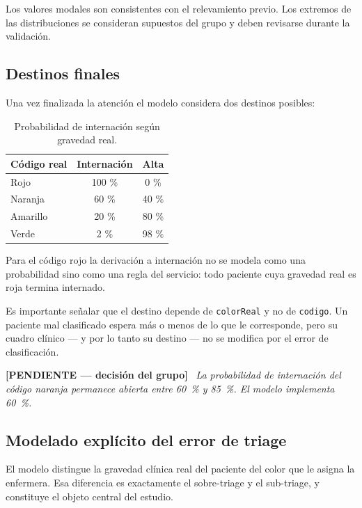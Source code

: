 \documentclass{article}
\newenvironment{pendiente}
  {\par\medskip\noindent\begingroup\color{red!65!black}%
   \textbf{[PENDIENTE — decisión del grupo]}\ \itshape}
  {\endgroup\par\medskip}
\begin{document}
Los valores modales son consistentes con el relevamiento previo. Los extremos
de las distribuciones se consideran supuestos del grupo y deben revisarse
durante la validación.

\subsection{Destinos finales}

Una vez finalizada la atención el modelo considera dos destinos posibles:

\begin{table}[H]
\centering
\begin{tabular}{lcc}
\toprule
\textbf{Código real} & \textbf{Internación} & \textbf{Alta} \\
\midrule
Rojo     & 100 \% & 0 \% \\
Naranja  & 60 \%  & 40 \% \\
Amarillo & 20 \%  & 80 \% \\
Verde    & 2 \%   & 98 \% \\
\bottomrule
\end{tabular}
\caption{Probabilidad de internación según gravedad real.}
\label{tab:destinos}
\end{table}

Para el código rojo la derivación a internación no se modela como una
probabilidad sino como una regla del servicio: todo paciente cuya gravedad
real es roja termina internado.

Es importante señalar que el destino depende de \texttt{colorReal} y no de
\texttt{codigo}. Un paciente mal clasificado espera más o menos de lo que le
corresponde, pero su cuadro clínico --- y por lo tanto su destino --- no se
modifica por el error de clasificación.

\begin{pendiente}
La probabilidad de internación del código naranja permanece abierta entre
60~\% y 85~\%. El modelo implementa 60~\%.
\end{pendiente}

\subsection{Modelado explícito del error de triage}
\label{sec:error}

El modelo distingue la gravedad clínica real del paciente del color que le
asigna la enfermera. Esa diferencia es exactamente el sobre-triage y el
sub-triage, y constituye el objeto central del estudio.
\end{document}
